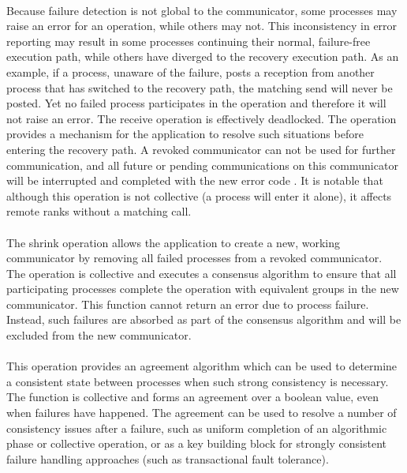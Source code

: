 \paragraph{}

Because failure detection is not global to the communicator, some processes may
raise an error for an operation, while others may not. This inconsistency in
error reporting may result in some processes continuing their normal,
failure-free execution path, while others have diverged to the recovery
execution path. As an example, if a process, unaware of the failure, posts a
reception from another process that has switched to the recovery path, the
matching send will never be posted. Yet no failed process participates in the
operation and therefore it will not raise an error. The receive operation is
effectively deadlocked.  The  operation provides a
mechanism for the application to resolve such situations before entering the
recovery path. A revoked communicator can not be used for further communication,
and all future or pending communications on this communicator will be
interrupted and completed with the new error code .
It is notable that although this operation is not collective (a process will
enter it alone), it affects remote ranks without a matching call.

\paragraph{}

The shrink operation allows the application to create a new, working
communicator by removing all failed processes from a revoked communicator. The
operation is collective and executes a consensus algorithm to ensure that all
participating processes complete the operation with equivalent groups in the new
communicator.  This function cannot return an error due to process failure.
Instead, such failures are absorbed as part of the consensus algorithm and will be
excluded from the new communicator.

\paragraph{}

This operation provides an agreement algorithm which can be used to determine a
consistent state between processes when such strong consistency is necessary.
The function is collective and forms an agreement over a boolean value, even
when failures have happened.  The agreement can be used to resolve a number of
consistency issues after a failure, such as uniform completion of an algorithmic
phase or collective operation, or as a key building block for strongly
consistent failure handling approaches (such as transactional fault tolerance).

